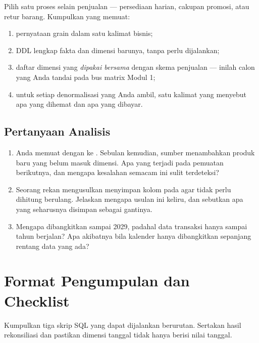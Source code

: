 Pilih satu proses selain penjualan --- persediaan harian, cakupan promosi, atau
retur barang. Kumpulkan  yang memuat:

\begin{enumerate}[leftmargin=1.4em]
  \item pernyataan grain dalam satu kalimat bisnis;
  \item DDL lengkap fakta dan dimensi barunya, tanpa perlu dijalankan;
  \item daftar dimensi yang \emph{dipakai bersama} dengan skema penjualan ---
        inilah calon  yang Anda tandai pada bus
        matrix Modul 1;
  \item untuk setiap denormalisasi yang Anda ambil, satu kalimat yang menyebut
        apa yang dihemat dan apa yang dibayar.
\end{enumerate}

\subsection{Pertanyaan Analisis}

\begin{enumerate}[leftmargin=1.4em]
  \item Anda memuat  dengan  ke
        . Sebulan kemudian, sumber menambahkan produk baru
        yang belum masuk dimensi. Apa yang terjadi pada pemuatan berikutnya, dan
        mengapa kesalahan semacam ini sulit terdeteksi?
  \item Seorang rekan mengusulkan menyimpan kolom  pada
         agar tidak perlu dihitung berulang. Jelaskan
        mengapa usulan ini keliru, dan sebutkan apa yang seharusnya disimpan
        sebagai gantinya.
  \item Mengapa  dibangkitkan sampai 2029, padahal data
        transaksi hanya sampai tahun berjalan? Apa akibatnya bila kalender hanya
        dibangkitkan sepanjang rentang data yang ada?
\end{enumerate}

\section{Format Pengumpulan dan Checklist}

Kumpulkan tiga skrip SQL yang dapat dijalankan berurutan. Sertakan hasil
rekonsiliasi dan pastikan dimensi tanggal tidak hanya berisi nilai tanggal.

